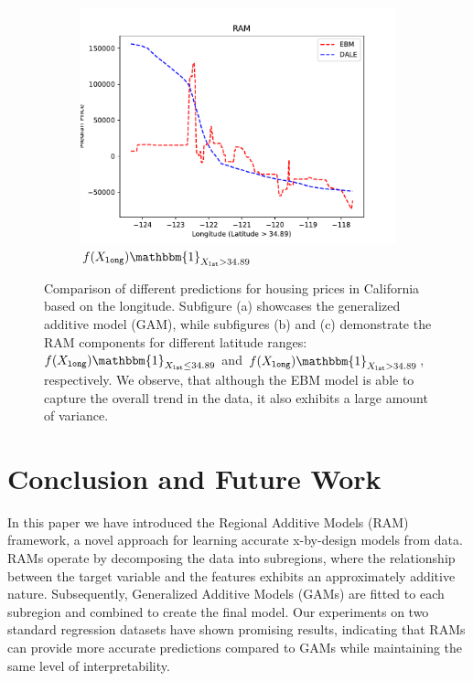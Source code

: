 \documentclass[12pt]{article}
\newcommand{\when}[1]{\mathbbm{1}_{#1}}
\begin{document}
\begin{figure}[htbp]
\begin{subfigure}{0.32\textwidth}
        \centering
        \includegraphics[width=\textwidth]{figures/california_ram_2}
        \caption{\(f(X_{\mathtt{long}}) \when{X_{\mathtt{lat}} > 34.89}\)}
        \label{subfig:california_ram_2}
    \end{subfigure}
    \caption{Comparison of different predictions for housing prices in California based on the longitude.
    Subfigure (a) showcases the generalized additive model (GAM),
        while subfigures (b) and (c) demonstrate the RAM components for different latitude ranges:
        \(f(X_{\mathtt{long}}) \when{X_{\mathtt{lat}} \leq 34.89}\) and
        \(f(X_{\mathtt{long}}) \when{X_{\mathtt{lat}} > 34.89}\), respectively.
        We observe, that although the EBM model is able to capture the overall trend in the data,
        it also exhibits a large amount of variance.}
    \label{fig:california_housing}
\end{figure}

\section{Conclusion and Future Work}

In this paper we have introduced the Regional Additive Models (RAM) framework, a novel approach for learning accurate
x-by-design models from data.
RAMs operate by decomposing the data into subregions, where the relationship between the target variable and the
features exhibits an approximately additive nature.
Subsequently, Generalized Additive Models (GAMs) are fitted to each subregion and combined to create the final model.
Our experiments on two standard regression datasets have shown promising results, indicating that RAMs can provide more accurate predictions compared to GAMs while maintaining the same level of interpretability.
\end{document}
